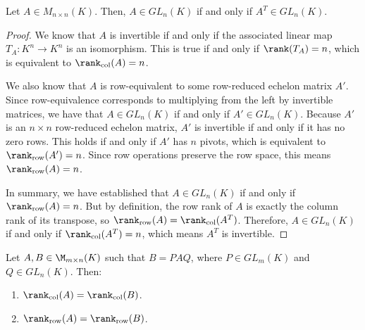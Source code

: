 \begin{lemma}
\label{lemma:transpose_invertibility}
Let $A \in M_{n \times n}(K)$. Then, $A \in GL_n(K)$ if and only if $A^T \in GL_n(K)$.
\end{lemma}

\begin{proof}
We know that $A$ is invertible if and only if the associated linear map $T_A: K^n \to K^n$ is an isomorphism. This is true if and only if $\rank(T_A) = n$, which is equivalent to $\rank_{\text{col}}(A) = n$.

We also know that $A$ is row-equivalent to some row-reduced echelon matrix $A'$. Since row-equivalence corresponds to multiplying from the left by invertible matrices, we have that $A \in GL_n(K)$ if and only if $A' \in GL_n(K)$. Because $A'$ is an $n \times n$ row-reduced echelon matrix, $A'$ is invertible if and only if it has no zero rows. This holds if and only if $A'$ has $n$ pivots, which is equivalent to $\rank_{\text{row}}(A') = n$. Since row operations preserve the row space, this means $\rank_{\text{row}}(A) = n$.

In summary, we have established that $A \in GL_n(K)$ if and only if $\rank_{\text{row}}(A) = n$. But by definition, the row rank of $A$ is exactly the column rank of its transpose, so $\rank_{\text{row}}(A) = \rank_{\text{col}}(A^T)$. Therefore, $A \in GL_n(K)$ if and only if $\rank_{\text{col}}(A^T) = n$, which means $A^T$ is invertible.
\end{proof}

\begin{lemma}
\label{lemma:rank_invariance_equivalence}
Let $A, B \in \M_{m \times n}(K)$ such that $B = P A Q$, where $P \in GL_m(K)$ and $Q \in GL_n(K)$. Then:
\begin{enumerate}
    \item $\rank_{\text{col}}(A) = \rank_{\text{col}}(B)$.
    \item $\rank_{\text{row}}(A) = \rank_{\text{row}}(B)$.
\end{enumerate}
\end{lemma}

